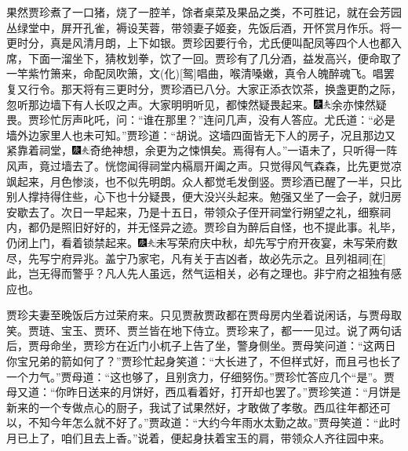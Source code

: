 果然贾珍煮了一口猪，烧了一腔羊，馀者桌菜及果品之类，不可胜记，就在会芳园丛绿堂中，屏开孔雀，褥设芙蓉，带领妻子姬妾，先饭后酒，开怀赏月作乐。将一更时分，真是风清月朗，上下如银。贾珍因要行令，尤氏便叫配凤等四个人也都入席，下面一溜坐下，猜枚划拳，饮了一回。贾珍有了几分酒，益发高兴，便命取了一竿紫竹箫来，命配凤吹箫，文{{(化)}}{[}鸳{]}唱曲，喉清嗓嫩，真令人魄醉魂飞。唱罢复又行令。那天将有三更时分，贾珍酒已八分。大家正添衣饮茶，换盏更酌之际，忽听那边墙下有人长叹之声。大家明明听见，都悚然疑畏起来。{\includegraphics[width=3mm]{../Images/00004}\includegraphics[width=3mm]{../Images/00012}\footnotesize \kaishu 余亦悚然疑畏。}贾珍忙厉声叱吒，问：``谁在那里？''连问几声，没有人答应。尤氏道：``必是墙外边家里人也未可知。''贾珍道：``胡说。这墙四面皆无下人的房子，况且那边又紧靠着祠堂，{\includegraphics[width=3mm]{../Images/00004}\includegraphics[width=3mm]{../Images/00012}\footnotesize \kaishu 奇绝神想，余更为之悚惧矣。}焉得有人。''一语未了，只听得一阵风声，竟过墙去了。恍惚闻得祠堂内槅扇开阖之声。只觉得风气森森，比先更觉凉飒起来，月色惨淡，也不似先明朗。众人都觉毛发倒竖。贾珍酒已醒了一半，只比别人撑持得住些，心下也十分疑畏，便大没兴头起来。勉强又坐了一会子，就归房安歇去了。次日一早起来，乃是十五日，带领众子侄开祠堂行朔望之礼，细察祠内，都仍是照旧好好的，并无怪异之迹。贾珍自为醉后自怪，也不提此事。礼毕，仍闭上门，看着锁禁起来。{\includegraphics[width=3mm]{../Images/00004}\includegraphics[width=3mm]{../Images/00012}\footnotesize \kaishu 未写荣府庆中秋，却先写宁府开夜宴，未写荣府数尽，先写宁府异兆。盖宁乃家宅，凡有关于吉凶者，故必先示之。且列祖祠{[}在{]}此，岂无得而警乎？凡人先人虽远，然气运相关，必有之理也。非宁府之祖独有感应也。}

贾珍夫妻至晚饭后方过荣府来。只见贾赦贾政都在贾母房内坐着说闲话，与贾母取笑。贾琏、宝玉、贾环、贾兰皆在地下侍立。贾珍来了，都一一见过。说了两句话后，贾母命坐，贾珍方在近门小杌子上告了坐，警身侧坐。贾母笑问道：``这两日你宝兄弟的箭如何了？''贾珍忙起身笑道：``大长进了，不但样式好，而且弓也长了一个力气。''贾母道：``这也够了，且别贪力，仔细努伤。''贾珍忙答应几个``是''。贾母又道：``你昨日送来的月饼好，西瓜看着好，打开却也罢了。''贾珍笑道：``月饼是新来的一个专做点心的厨子，我试了试果然好，才敢做了孝敬。西瓜往年都还可以，不知今年怎么就不好了。''贾政道：``大约今年雨水太勤之故。''贾母笑道：``此时月已上了，咱们且去上香。''说着，便起身扶着宝玉的肩，带领众人齐往园中来。

